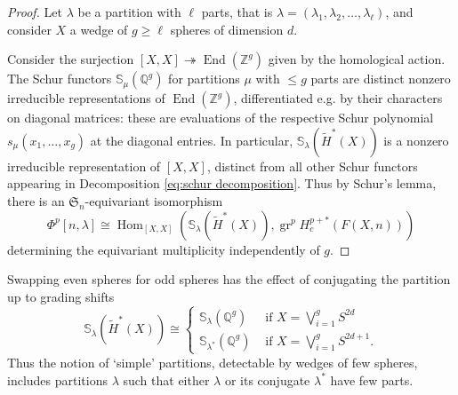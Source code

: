 \documentclass[12pt]{article}
\newcommand{\Z}{\mathbb{Z}}
\newcommand{\Q}{\mathbb{Q}}
\newcommand{\SymGroup}[1][n]{\mathfrak{S}_{#1}}
\newcommand{\TransposePartition}[1]{{#1}^{\ast}}
\newcommand{\Schur}[1]{\mathbb{S}_{#1}}
\newcommand{\onto}{\twoheadrightarrow}
\DeclareMathOperator{\End}{End}
\DeclareMathOperator{\gr}{gr}
\DeclareMathOperator{\Hom}{Hom}
\theoremstyle{plain}
\theoremstyle{definition}
\theoremstyle{remark}
\begin{document}
\begin{proof}%
    Let $\lambda$ be a partition with $\ell$ parts, that is $\lambda = (\lambda_1, \lambda_2,\ldots,\lambda_{\ell})$, and consider $X$ a wedge of $g\geq \ell$ spheres of dimension $d$. 
    
    
    Consider the surjection $[X,X] \onto \End(\Z^g)$ given by the homological action. The Schur functors $\Schur{\mu}(\Q^{g})$ for partitions $\mu$ with $\leq g$ parts are distinct nonzero irreducible representations of $\End(\Z^{g})$, differentiated e.g. by their characters on diagonal matrices: these are evaluations of the respective Schur polynomial $s_\mu(x_1,\ldots,x_g)$ at the diagonal entries. In particular, $\Schur{\lambda}(\tilde{H}^*(X))$ is a nonzero irreducible representation of $[X,X]$, distinct from all other Schur functors appearing in Decomposition \eqref{eq:schur decomposition}. Thus by Schur's lemma, there is an $\SymGroup$-equivariant isomorphism
    \begin{equation}
        \Phi^p[n,\lambda] \cong \Hom_{[X,X]}\left( \Schur{\lambda}(\tilde{H}^*(X)), \gr^p H^{p+*}_c(F(X,n)) \right)
    \end{equation}
    determining the equivariant multiplicity independently of $g$.
\end{proof}

Swapping even spheres for odd spheres has the effect of conjugating the partition up to grading shifts
\begin{equation}
    \Schur{\lambda}(\tilde{H}^*(X)) \cong \begin{cases}
    \Schur{\lambda}(\Q^g) & \text{ if } X = \bigvee_{i=1}^g S^{2d} \\
    \Schur{\TransposePartition{\lambda}}(\Q^g) & \text{ if } X = \bigvee_{i=1}^g S^{2d+1}.
    \end{cases}
\end{equation}
Thus the notion of `simple' partitions, detectable by wedges of few spheres, includes partitions $\lambda$ such that either $\lambda$ or its conjugate $\TransposePartition{\lambda}$ have few parts.
\end{document}
